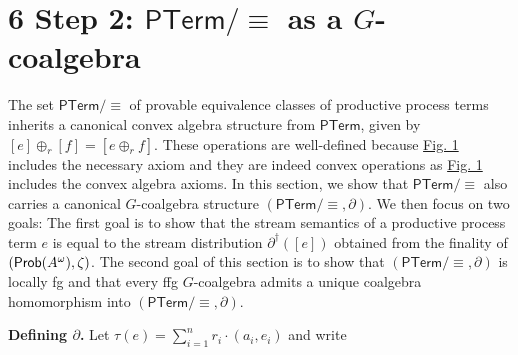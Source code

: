 %
\hypertarget{html:S6}{} %
\hypertarget{html:S6.m1}{}%
\hypertarget{html:S6.m2}{}\section*{6 Step 2: \({\mathsf{PTerm}/{\equiv}}\) as a \({G}\)-coalgebra}
\hypertarget{html:S6.p1}{} The set %
\hypertarget{html:S6.p1.m1}{}\({\mathsf{PTerm}/{\equiv}}\) of provable equivalence classes of productive process terms inherits a canonical convex algebra structure from %
\hypertarget{html:S6.p1.m2}{}\({\mathsf{PTerm}}\), given by %
\hypertarget{html:S6.p1.m3}{}\({[e]\oplus_{r}[f]=[e\oplus_{r}f]}\). These operations are well-defined because \hyperlink{html:S3.F1}{Fig. 1} includes the necessary axiom and they are indeed convex operations as \hyperlink{html:S3.F1}{Fig. 1} includes the convex algebra axioms. In this section, we show that %
\hypertarget{html:S6.p1.m4}{}\({\mathsf{PTerm}/{\equiv}}\) also carries a canonical %
\hypertarget{html:S6.p1.m5}{}\({G}\)-coalgebra structure %
\hypertarget{html:S6.p1.m6}{}\({(\mathsf{PTerm}/{\equiv},\partial)}\). We then focus on two goals: The first goal is to show that the stream semantics of a productive process term %
\hypertarget{html:S6.p1.m7}{}\({e}\) is equal to the stream distribution %
\hypertarget{html:S6.p1.m8}{}\({\partial^{\dagger}([e])}\) obtained from the finality of %
\hypertarget{html:S6.p1.m9}{}\({(\text{\sf Prob}(A^{\omega}),\zeta)}\). The second goal of this section is to show that %
\hypertarget{html:S6.p1.m10}{}\({(\mathsf{PTerm}/{\equiv},\partial)}\) is locally fg and that every ffg %
\hypertarget{html:S6.p1.m11}{}\({G}\)-coalgebra admits a unique coalgebra homomorphism into %
\hypertarget{html:S6.p1.m12}{}\({(\mathsf{PTerm}/{\equiv},\partial)}\).
\par\medskip
\hypertarget{html:S6.SS0.SSS0.P0.SPx1}{} \par\noindent\textbf{Defining %
\hypertarget{html:S6.SS0.SSS0.P0.SPx1.m1}{}\({\partial}\).}\quad  %
\hypertarget{html:S6.SS0.SSS0.P0.SPx1.p1}{} Let %
\hypertarget{html:S6.SS0.SSS0.P0.SPx1.p1.m1}{}\({\tau(e)=\sum_{i=1}^{n}r_{i}\cdot(a_{i},e_{i})}\) and write %
